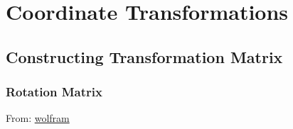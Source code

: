 \newpage
\chapter{Coordinate Transformations}


\newpage

\section{Constructing Transformation Matrix}

\subsection{Rotation Matrix}

From: \href{https://mathworld.wolfram.com/RotationMatrix.html}{wolfram}

